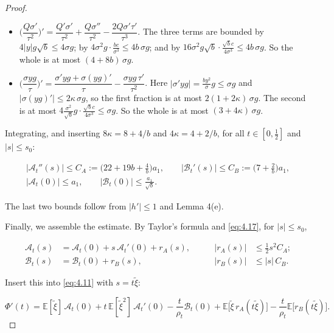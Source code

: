 \documentclass[aip,jmp,preprint,onecolumn,floatfix,superscriptaddress,nofootinbib,11pt]{revtex4-2}
\theoremstyle{plain}
\theoremstyle{remark}
\numberwithin{equation}{section}
\newcommand{\E}{\mathbb{E}}
\begin{document}
\begin{proof}
\begin{itemize}
\item $\Big(\dfrac{Q\sigma'}{\tau^{2}}\Big)'=\dfrac{Q'\sigma'}{\tau^{2}}+\dfrac{Q\sigma''}{\tau^{2}}-\dfrac{2Q\sigma'\tau'}{\tau^{3}}$. The three terms are bounded by $4|y|g\sqrt b\le4\sigma g$; by $4\sigma^{2}g\cdot\tfrac{bc}{\sigma^{3}}\le4b\,\sigma g$; and by $16\sigma^{2}g\sqrt b\cdot\tfrac{\sqrt bc}{4\sigma^{3}}\le4b\,\sigma g$. So the whole is at most $(4+8b)\,\sigma g$.
\item $\Big(\dfrac{\sigma yg}{\tau}\Big)'=\dfrac{\sigma'yg+\sigma(yg)'}{\tau}-\dfrac{\sigma yg\,\tau'}{\tau^{2}}$. Here $|\sigma'yg|=\tfrac{by^{2}}{\sigma}g\le\sigma g$ and $|\sigma(yg)'|\le2\kappa\,\sigma g$, so the first fraction is at most $2(1+2\kappa)\,\sigma g$. The second is at most $4\tfrac{\sigma^{2}}{\sqrt b}g\cdot\tfrac{\sqrt bc}{4\sigma^{3}}\le\sigma g$. So the whole is at most $(3+4\kappa)\,\sigma g$.
\end{itemize}

Integrating, and inserting $8\kappa=8+4/b$ and $4\kappa=4+2/b$, for all $t\in[0,\tfrac12]$ and $|s|\le s_0$:

\begin{equation}
\begin{gathered} |\mathcal A_t''(s)|\le C_A:=\Big(22+19b+\frac4b\Big)a_1,\qquad |\mathcal B_t'(s)|\le C_B:=\Big(7+\frac2b\Big)a_1,\\[4pt] |\mathcal A_t(0)|\le a_1,\qquad |\mathcal B_t(0)|\le\frac{a_1}{\sqrt b}. \end{gathered}
\label{eq:4.17}
\end{equation}

The last two bounds follow from $|h'|\le1$ and Lemma 4(e).

Finally, we assemble the estimate. By Taylor's formula and \eqref{eq:4.17}, for $|s|\le s_0$,

\begin{equation*}
\begin{aligned} \mathcal A_t(s)&=\mathcal A_t(0)+s\,\mathcal A_t'(0)+r_A(s),&\qquad |r_A(s)|&\le\tfrac12s^{2}C_A;\\[4pt] \mathcal B_t(s)&=\mathcal B_t(0)+r_B(s),&\qquad |r_B(s)|&\le|s|\,C_B . \end{aligned}
\end{equation*}

Insert this into \eqref{eq:4.11} with $s=t\tilde\xi$:

\begin{equation*}
\Phi'(t)=\E[\tilde\xi]\,\mathcal A_t(0)+t\,\E[\tilde\xi^{2}]\,\mathcal A_t'(0)-\frac{t}{\rho_t}\mathcal B_t(0)+\E\big[\tilde\xi\,r_A(t\tilde\xi)\big]-\frac{t}{\rho_t}\E\big[r_B(t\tilde\xi)\big].
\end{equation*}


\end{proof}
\end{document}
